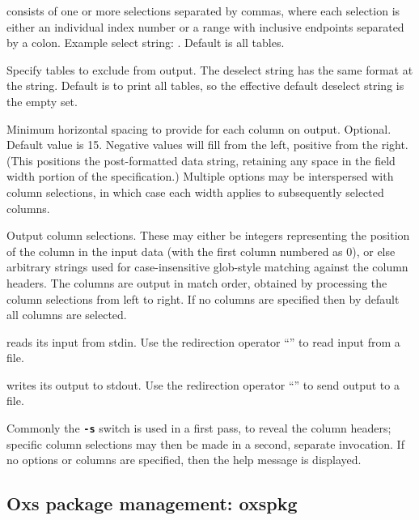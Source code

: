 \begin{description}
  consists of one or more selections separated by commas, where each
  selection is either an individual index number or a range with
  inclusive endpoints separated by a colon.  Example select string:
  .  Default is all tables.
\item[\optkey{-no-table deselect}]
  Specify tables to exclude from output.  The deselect string has the
  same format at the  string.  Default is to print all
  tables, so the effective default deselect string is the empty set.
\item[\optkey{-w colwidth}]
  Minimum horizontal spacing to provide for each column on output.
  Optional.  Default value is 15. Negative  values will
  fill from the left, positive from the right. (This positions the
  post-formatted data string, retaining any space in the field width
  portion of the  specification.) Multiple 
  options may be interspersed with column selections, in which case each
  width applies to subsequently selected columns.
\item[\optkey{col \ldots}]
  Output column selections.  These may either be integers representing
  the position of the column in the input data (with the first column
  numbered as 0), or else arbitrary strings used for case-insensitive
  glob-style matching against the column headers.  The columns are
  output in match order, obtained by processing the column selections
  from left to right.  If no columns are specified then by default all
  columns are selected.
\item[\optkey{\boa infile}]
   reads its input from stdin.  Use the redirection operator
  ``\boa'' to read input from a file.
\item[\optkey{\bca outfile}]
   writes its output to stdout.  Use the redirection operator
  ``\bca'' to send output to a file.
\end{description}
Commonly the \texttt{\textbf{-s}} switch is used in a first pass, to
reveal the column headers; specific column selections may then be made
in a second, separate invocation.  If no options or columns are
specified, then the help message is displayed.


\subsection{Oxs package management:
            oxspkg\label{sec:oxspkg}}%


